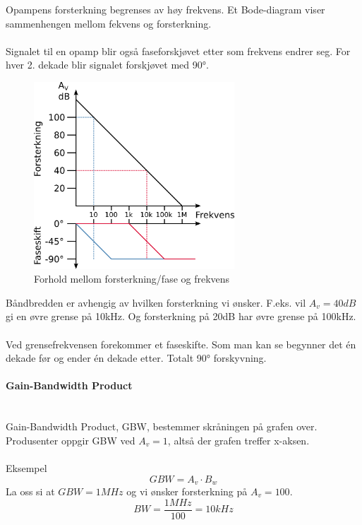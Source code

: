 Opampens forsterkning begrenses av høy frekvens.
Et Bode-diagram viser sammenhengen mellom fekvens og forsterkning.
\\\\
Signalet til en opamp blir også faseforskjøvet etter som frekvens endrer seg.
For hver 2. dekade blir signalet forskjøvet med 90°.

\begin{figure}[H]
  \caption{Forhold mellom forsterkning/fase og frekvens}
  \centering
  \includegraphics[width=0.67\textwidth]{./img/frekfor}
\end{figure}

Båndbredden er avhengig av hvilken forsterkning vi ønsker.
F.eks. vil $A_v = 40dB$ gi en øvre grense på 10kHz.
Og forsterkning på 20dB har øvre grense på 100kHz.
\\\\
Ved grensefrekvensen forekommer et faseskifte.
Som man kan se begynner det én dekade før og ender én dekade etter.
Totalt 90° forskyvning.



\paragraph{Gain-Bandwidth Product} \mbox{} \\
Gain-Bandwidth Product, GBW, bestemmer skråningen på grafen over.
Produsenter oppgir GBW ved $A_v = 1$, altså der grafen treffer x-aksen.
\\\\
Eksempel\\
$$GBW = A_v \cdot B_w$$
La oss si at $GBW = 1MHz$ og vi ønsker forsterkning på $A_v = 100$.
$$BW = \frac{1MHz}{100} = 10kHz$$
